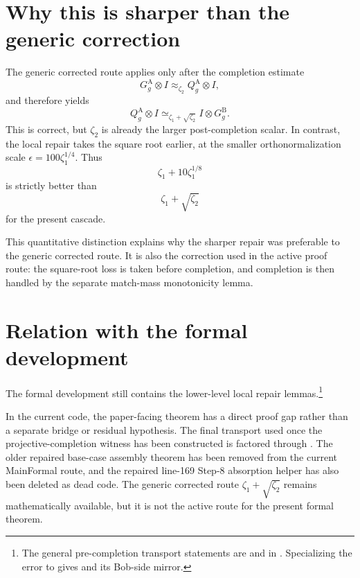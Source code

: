 \documentclass[11pt]{article}
\begin{document}
\section{Why this is sharper than the generic correction}

The generic corrected route applies  only after the
completion estimate
\[
  G^{\mathrm A}_g \otimes I \approx_{\zeta_2} Q^{\mathrm A}_g \otimes I,
\]
and therefore yields
\[
  Q^{\mathrm A}_g \otimes I
  \simeq_{\zeta_1 + \sqrt{\zeta_2}}
  I \otimes G^{\mathrm B}_g.
\]
This is correct, but $\zeta_2$ is already the larger post-completion scalar.  In
contrast, the local repair takes the square root earlier, at the smaller
orthonormalization scale $\epsilon=100\zeta_1^{1/4}$.  Thus
\[
  \zeta_1 + 10\zeta_1^{1/8}
\]
is strictly better than
\[
  \zeta_1 + \sqrt{\zeta_2}
\]
for the present cascade.

This quantitative distinction explains why the sharper repair was preferable
to the generic corrected route.  It is also the correction used in the active
 proof route: the square-root loss is
taken before completion, and completion is then handled by the separate
match-mass monotonicity lemma.

\section{Relation with the formal development}

The formal development still contains the lower-level local repair lemmas.\footnote{The
general pre-completion transport statements are
and
in
.
Specializing the error to
gives
and its Bob-side mirror.}

In the current code, the paper-facing theorem
 has a direct proof gap rather than a
separate bridge or residual hypothesis.  The final transport used once the
projective-completion witness has been constructed is factored through
.  The
older repaired base-case assembly theorem has been removed from the current
MainFormal route, and the repaired line-169 Step-8 absorption helper has also
been deleted as dead code.  The generic corrected route
$\zeta_1 + \sqrt{\zeta_2}$ remains mathematically available, but it is not the
active route for the present formal theorem.
\end{document}
